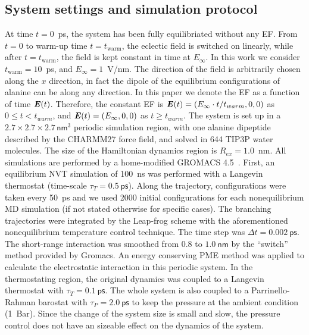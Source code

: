 \documentclass[a4paper,preprint,unsortedaddress,onecolumn]{revtex4-1}
\newcommand{\vect}[1]{\textbf{\textit{#1}}}
\begin{document}
\subsection{System settings and simulation protocol}
At time $t=0$~ps, the system
has been fully equilibriated without any EF. From $t=0$ to
warm-up time $t=t_{\textrm{warm}}$, the eclectic field is switched on linearly, while
after $t=t_{\textrm{warm}}$, the field is kept constant in time at
$E_{\infty}$.  In this work we consider $t_{\textrm{warm}} = 10$~ps,
and $E_{\infty} = 1$~V/nm.
The direction of the field is arbitrarily chosen along the
$x$ direction, in fact the dipole of the equilibrium configurations of
alanine can be along any direction.
In this paper we denote the
EF as a function of time $\vect E(t)$.
Therefore, the constant EF is
$\vect E(t) = (E_\infty\cdot t/t_{warm},0,0)$ as $0\leq t < t_{warm}$, and 
$\vect E(t) = (E_\infty,0,0)$
as $t \geq t_{warm}$.
The system is set up in a $2.7\times 2.7\times
2.7\, \textsf{nm}^3$ periodic simulation region, with one alanine dipeptide
described by the CHARMM27 force field, and solved in 644 TIP3P
water molecules.
The size of the  Hamiltonian dynamics region is $R_{ex} = 1.0$~nm.
All simulations are performed by a home-modified GROMACS 4.5~\cite{pronk2013gromacs}.
First, an equilibrium NVT simulation of
100~\textsf{ns} was performed with a Langevin thermostat (time-scale
$\tau_T = 0.5~\textsf{ps}$).  Along the trajectory, configurations were taken every
50~\textsf{ps} and we used 2000 initial configurations for each nonequilibrium
MD simulation (if not stated otherwise for specific cases).
The branching trajectories were integrated by the
Leap-frog scheme with the aforementioned nonequilibrium
temperature control technique.  The
time step was $\Delta t = 0.002~\textsf{ps}$. The short-range
interaction was smoothed from $0.8$ to $1.0~\textsf{nm}$ by the
``switch'' method provided by Gromacs.  An energy conserving PME
method was applied to calculate the electrostatic interaction in this
periodic system. In the thermostating region, the original dynamics was
coupled to a Langevin thermostat with $\tau_T = 0.1~\textsf{ps}$.
The whole system is also coupled to a Parrinello-Rahman barostat with $\tau_P = 2.0~\textsf{ps}$ to keep
the pressure at the ambient condition (1~Bar). Since the
change of the system size is small and slow, the pressure control
does not have an sizeable effect on the
dynamics of the system.
\end{document}
